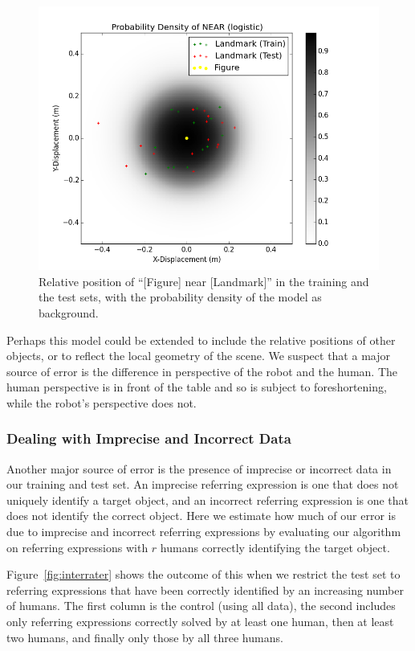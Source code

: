 \documentclass[conference]{IEEEtran}
\numberwithin{equation}{section}
\begin{document}
\begin{figure}[h!tb]
  \centering
    \includegraphics[width=\columnwidth]{near_train_test_comp}
  \caption{Relative position of ``[Figure] near [Landmark]'' in the training and the test sets, with the probability density of the model as background.}
  \label{fig:near_comp}
\end{figure}

Perhaps this model could be extended to include the relative positions of other objects, or to reflect the local geometry of the scene. We suspect that a major source of error is the difference in perspective of the robot and the human. The human perspective is in front of the table and so is subject to foreshortening, while the robot's perspective does not.

\subsubsection{Dealing with Imprecise and Incorrect Data}

Another major source of error is the presence of imprecise or incorrect data in our training and test set. An imprecise referring expression is one that does not uniquely identify a target object, and an incorrect referring expression is one that does not identify the correct object. Here we estimate how much of our error is due to imprecise and incorrect referring expressions by evaluating our algorithm on referring expressions with $r$ humans correctly identifying the target object.

Figure~\ref{fig:interrater} shows the outcome of this when we restrict the test set to referring expressions that have been correctly identified by an increasing number of humans. The first column is the control (using all data), the second includes only referring expressions correctly solved by at least one human, then at least two humans, and finally only those by all three humans.
\end{document}
